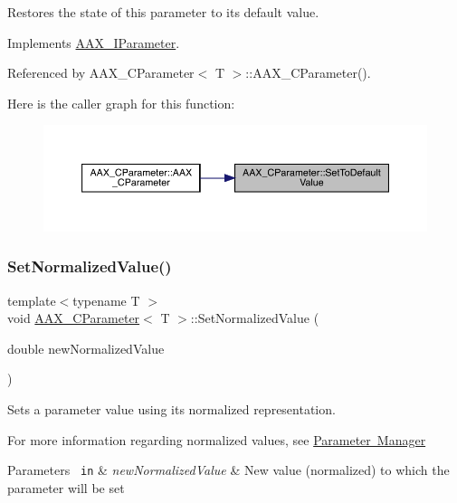 Restores the state of this parameter to its default value. 



Implements \mbox{\hyperlink{a01857_a29da0f77778437b19f1c8a666558357a}{A\+A\+X\+\_\+\+I\+Parameter}}.



Referenced by A\+A\+X\+\_\+\+C\+Parameter$<$ T $>$\+::\+A\+A\+X\+\_\+\+C\+Parameter().

Here is the caller graph for this function\+:
\nopagebreak
\begin{figure}[H]
\begin{center}
\leavevmode
\includegraphics[width=350pt]{a01537_a9ae87f0a8655c68ac7c59bec3f476c48_icgraph}
\end{center}
\end{figure}
\mbox{\label{a01537_ac4f8ae8c5ecb2cd04ebc3aa2523449f7}} 
\subsubsection{\texorpdfstring{SetNormalizedValue()}{SetNormalizedValue()}}
{\footnotesize\ttfamily template$<$typename T $>$ \\
void \mbox{\hyperlink{a01537}{A\+A\+X\+\_\+\+C\+Parameter}}$<$ T $>$\+::Set\+Normalized\+Value (\begin{DoxyParamCaption}\item[{double}]{new\+Normalized\+Value }\end{DoxyParamCaption})\hspace{0.3cm}{\ttfamily [virtual]}}



Sets a parameter value using it\textquotesingle{}s normalized representation. 

For more information regarding normalized values, see \mbox{\hyperlink{a00814}{Parameter Manager}}


\begin{DoxyParams}[1]{Parameters}
\mbox{\texttt{ in}}  & {\em new\+Normalized\+Value} & New value (normalized) to which the parameter will be set \\
\hline
\end{DoxyParams}


